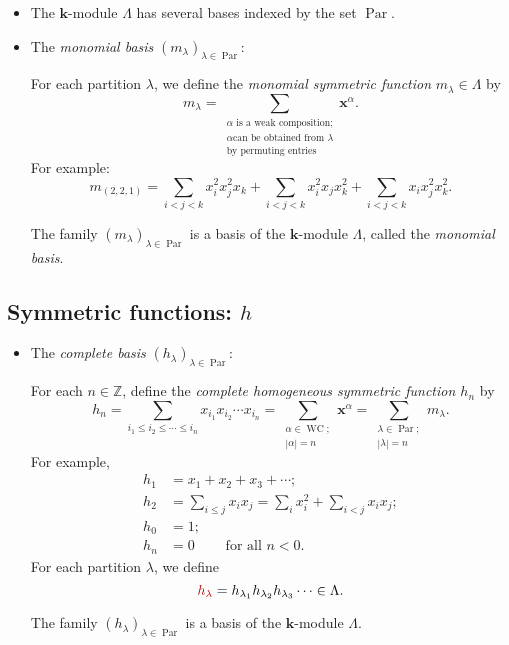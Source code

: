 \documentclass[numbers=enddot,12pt,final,onecolumn,notitlepage]{scrartcl}%
\newcommand{\Par}{\operatorname{Par}}
\newcommand{\defn}[1]{{\color{darkred}\emph{#1}}}
\newcommand{\defnm}[1]{{\color{darkred} #1}}
\newcommand{\0}{\phantom{c}}
\let\sumnonlimits\sum
\renewcommand{\sum}{\sumnonlimits\limits}
\begin{document}
\begin{itemize}
\item The $\mathbf{k}$-module $\Lambda$ has several bases indexed by the set
$\operatorname*{Par}$.

\item The \defn{monomial basis} $\left(  m_{\lambda}\right)  _{\lambda
\in\operatorname*{Par}}$:

For each partition $\lambda$, we define the
\defn{monomial symmetric function
}$m_{\lambda}\in\Lambda$ by
\[
m_{\lambda}=\sum_{\substack{\alpha\text{ is a weak composition;}\\\alpha\text{
can be obtained from }\lambda\\\text{by permuting entries}}}\mathbf{x}%
^{\alpha}.
\]
For example:%
\[
m_{\left(  2,2,1\right)  }=\sum_{i<j<k}x_{i}^{2}x_{j}^{2}x_{k}+\sum
_{i<j<k}x_{i}^{2}x_{j}x_{k}^{2}+\sum_{i<j<k}x_{i}x_{j}^{2}x_{k}^{2}.
\]


The family $\left(  m_{\lambda}\right)  _{\lambda\in\operatorname*{Par}}$ is a
basis of the $\mathbf{k}$-module $\Lambda$, called the \defn{monomial basis}.
\end{itemize}

\subsection{Symmetric functions: $h$}

\begin{itemize}
\item The \defn{complete basis} $\left(  h_{\lambda}\right)  _{\lambda
\in\operatorname*{Par}}$:

For each $n\in\mathbb{Z}$, define the \defn{complete homogeneous symmetric
function $h_{n}$} by%
\[
h_{n}=\sum_{i_{1}\leq i_{2}\leq\cdots\leq i_{n}}x_{i_{1}}x_{i_{2}}\cdots
x_{i_{n}}=\sum_{\substack{\alpha\in\operatorname*{WC};\\\left\vert
\alpha\right\vert =n}}\mathbf{x}^{\alpha}
=
\sum_{\substack{\lambda \in \Par; \\ \left|\lambda\right| = n}}m_{\lambda}.
\]
For example,%
\begin{align*}
h_{1}  &  =x_{1}+x_{2}+x_{3}+\cdots;\\
h_{2}  &  =\sum_{i\leq j}x_{i}x_{j}=\sum_{i}x_{i}^{2}+\sum_{i<j}x_{i}x_{j};\\
h_{0}  &  =1;\\
h_{n}  &  =0\ \ \ \ \ \ \ \ \ \ \text{for all }n<0.
\end{align*}
For each partition $\lambda$, we define
\[
\defnm{h_{\lambda}}=h_{\lambda_{1}}h_{\lambda_{2}}h_{\lambda_{3}}\cdots
\in\Lambda.
\]


The family $\left(  h_{\lambda}\right)  _{\lambda\in\operatorname*{Par}}$ is a
basis of the $\mathbf{k}$-module $\Lambda$.
\end{itemize}
\end{document}
